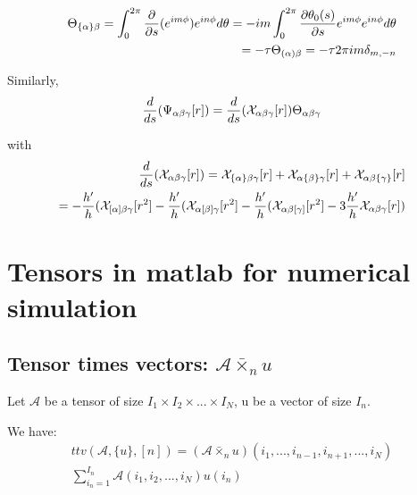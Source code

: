 \documentclass{Note}
\begin{document}
\begin{equation}
\begin{aligned}
\Theta_{\{\alpha\}\beta}=\int_0^{2\pi} {\partial \over \partial s}(e^{im\phi}) e^{in\phi} d\theta
=-im\int_0^{2\pi} {\partial\theta_0(s) \over \partial s}e^{im\phi}e^{in\phi} d\theta\\
=-\tau  \Theta_{(\alpha)\beta}=-\tau 2\pi   im \delta_{m,-n}
\end{aligned}
\end{equation}

Similarly,
\begin{equation}
\begin{aligned}
{d\over ds}(\Psi_{\alpha\beta\gamma}[r])={d\over ds}(\mathcal{X}_{\alpha\beta\gamma}[r])\Theta_{\alpha\beta\gamma}
\end{aligned}
\end{equation}

with
\begin{equation}
\begin{aligned}
{d\over ds}(\mathcal{X}_{\alpha\beta\gamma}[r])
=\mathcal{X}_{\{\alpha\}\beta\gamma}[r]+\mathcal{X}_{\alpha\{\beta\}\gamma}[r]+\mathcal{X}_{\alpha\beta\{\gamma\}}[r]\\
=-{h'\over h}(\mathcal{X}_{[\alpha]\beta\gamma}[r^2]-{h'\over h}(\mathcal{X}_{\alpha[\beta]\gamma}[r^2]-{h'\over h}(\mathcal{X}_{\alpha\beta[\gamma]}[r^2]-3{h'\over h}\mathcal{X}_{\alpha\beta\gamma}[r])
\end{aligned}
\end{equation}



\section{Tensors in matlab for numerical simulation}
\subsection{Tensor times vectors: $\mathcal{A}\bar{\times}_n u$}

Let $\mathcal{A}$ be a tensor of size $I_1\times I_2\times ...\times I_N$, u be a vector of size $I_n$.

We have:
\begin{equation}
\begin{aligned}
ttv(\mathcal{A},\{u\},[n])=(\mathcal{A}\bar{\times}_n u)(i_1,...,i_{n-1},i_{n+1},...,i_N)\\
\sum_{i_n=1}^{I_n}\mathcal{A}(i_1,i_2,...,i_N)u(i_n)
\end{aligned}
\end{equation}
\end{document}
